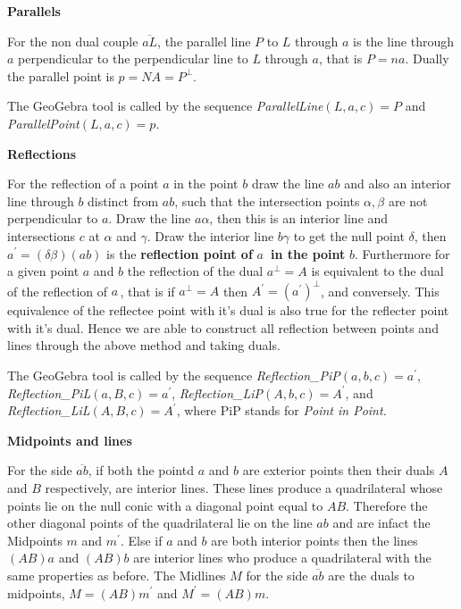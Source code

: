 \documentclass{unswthesis}
\begin{document}
\textbf{Parallels}

For the non dual couple $\overline{aL}$, the parallel line $P$ to $L$
through $a$ is the line through $a$ perpendicular to the perpendicular line
to $L$ through $a$, that is $P=na$. Dually the parallel point is $%
p=NA=P^{\perp }$.

The GeoGebra tool is called by the sequence \textit{ParallelLine}$\left(
L,a,c\right) =P$ and \textit{ParallelPoint}$\left( L,a,c\right) =p$.

\textbf{Reflections}\newline

For the reflection of a point $a$ in the point $b$ draw the line $ab$ and
also an interior line through $b$ distinct from $ab$, such that the
intersection points $\alpha ,\beta $ are not perpendicular to $a$. Draw the
line $a\alpha $, then this is an interior line and intersections $c$ at $%
\alpha $ and $\gamma $. Draw the interior line $b\gamma $ to get the null
point $\delta $, then $a^{\prime }=\left( \delta \beta \right) \left(
ab\right) $ is the \textbf{reflection point of }$a$\textbf{\ in the point }$b
$. Furthermore for a given point $a$ and $b$ the reflection of the dual $%
a^{\perp }=A$ is equivalent to the dual of the reflection of $a\,$, that is
if $a^{\perp }=A$ then $A^{\prime }=\left( a^{\prime }\right) ^{\perp }$,
and conversely. This equivalence of the reflectee point with it's dual is
also true for the reflecter point with it's dual. Hence we are able to
construct all reflection between points and lines through the above method
and taking duals.

The GeoGebra tool is called by the sequence \textit{Reflection\_PiP}$\left(
a,b,c\right) =a^{\prime }$, \textit{Reflection\_PiL}$\left( a,B,c\right)
=a^{\prime }$, \textit{Reflection\_LiP}$\left( A,b,c\right) =A^{\prime }$,
and \textit{Reflection\_LiL}$\left( A,B,c\right) =A^{\prime }$, where PiP
stands for \textit{Point in Point.}

\bigskip 

\textbf{Midpoints and lines}

For the side $\overline{ab}$, if both the pointd $a$ and $b$ are exterior
points then their duals $A$ and $B$ respectively, are interior lines. These
lines produce a quadrilateral whose points lie on the null conic with a
diagonal point equal to $AB$. Therefore the other diagonal points of the
quadrilateral lie on the line $ab$ and are infact the Midpoints $m$ and $%
m^{\prime }$. Else if $a$ and $b$ are both interior points then the lines $%
\left( AB\right) a$ and $\left( AB\right) b$ are interior lines who produce
a quadrilateral with the same properties as before. The Midlines $M$ for the
side $\overline{ab}$ are the duals to midpoints, $M=\left( AB\right)
m^{\prime }$ and $M^{\prime }=\left( AB\right) m$.
\end{document}
